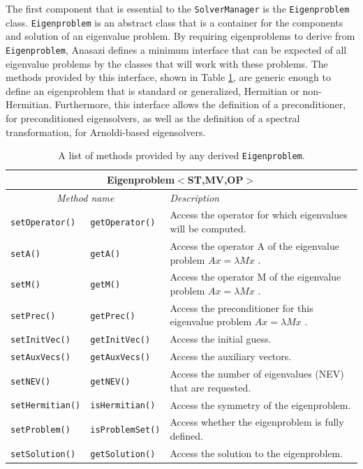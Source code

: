 \documentclass[acmtoms]{acmtrans2m}
\newcommand{\aspace}[1]{\texttt{#1}}
\begin{document}
The first component that is essential to the \aspace{SolverManager} is the 
\aspace{Eigenproblem} class.  \aspace {Eigenproblem} is an abstract class that is a container for 
the components and solution of an eigenvalue problem. By requiring eigenproblems to derive from
\aspace{Eigenproblem}, Anasazi defines a minimum interface that can be expected of all
eigenvalue problems by the classes that will work with these problems. The methods provided
by this interface, shown in Table \ref{tab:anasazi:eigenproblem}, are generic enough to define
an eigenproblem that is standard or generalized, Hermitian or non-Hermitian.  Furthermore, this
interface allows the definition of a preconditioner, for 
preconditioned eigensolvers, as well as the definition of a spectral transformation,
for Arnoldi-based eigensolvers. 
\begin{table}[htb]
\begin{center}
  \caption{A list of methods provided by any derived \aspace{Eigenproblem}.} 
\label{tab:anasazi:eigenproblem}
\begin{tabular}{| p{2cm}  p{2cm} | p{6cm} |}
\hline
\multicolumn{3}{|c|}{\textbf{Eigenproblem$<$ST,MV,OP$>$}} \\\hline
\multicolumn{2}{|c|}{\emph{Method name}} & \emph{Description} \\
\hline
{\tt setOperator()}&{\tt getOperator()}    & Access the operator for which eigenvalues will be computed. \\
{\tt setA()}&{\tt getA()}                  & Access the operator A of the eigenvalue problem $Ax=\lambda Mx$ . \\
{\tt setM()}&{\tt getM()}                  & Access the operator M of the eigenvalue problem $Ax=\lambda Mx$ . \\
{\tt setPrec()}&{\tt getPrec()}            & Access the preconditioner for this eigenvalue problem $Ax=\lambda Mx$ . \\
{\tt setInitVec()}&{\tt getInitVec()}      & Access the initial guess. \\
{\tt setAuxVecs()}&{\tt getAuxVecs()}      & Access the auxiliary vectors. \\
{\tt setNEV()}&{\tt getNEV()}              & Access the number of eigenvalues (NEV) that are requested.  \\
{\tt setHermitian()}&{\tt isHermitian()}   & Access the symmetry of the eigenproblem. \\
{\tt setProblem()}&{\tt isProblemSet()}    & Access whether the eigenproblem is fully defined.  \\
{\tt setSolution()}&{\tt getSolution()}    & Access the solution to the eigenproblem. \\
\hline
\end{tabular}
\end{center}
\end{table}
\end{document}

